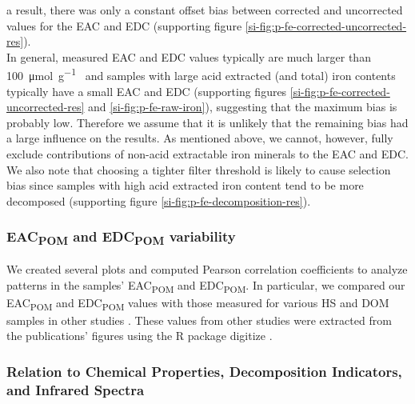 \documentclass[draft,linenumbers]{agujournal2018}
\begin{document}
a result, there was only a constant offset bias between corrected and
uncorrected values for the EAC and EDC (supporting figure
\ref{si-fig:p-fe-corrected-uncorrected-res}).\\
In general, measured EAC and EDC values typically are much larger than
\SI{100}{\micro\mol\per\gram\carbon} and samples with large acid
extracted (and total) iron contents typically have a small EAC and EDC
(supporting figures \ref{si-fig:p-fe-corrected-uncorrected-res} and
\ref{si-fig:p-fe-raw-iron}), suggesting that the maximum bias is
probably low. Therefore we assume that it is unlikely that the remaining
bias had a large influence on the results. As mentioned above, we
cannot, however, fully exclude contributions of non-acid extractable
iron minerals to the EAC and EDC. We also note that choosing a tighter
filter threshold is likely to cause selection bias since samples with
high acid extracted iron content tend to be more decomposed (supporting
figure \ref{si-fig:p-fe-decomposition-res}).

\subsubsection{\texorpdfstring{EAC\textsubscript{POM} and
EDC\textsubscript{POM} variability}{EAC and EDC variability}}

We created several plots and computed Pearson correlation coefficients
to analyze patterns in the samples' EAC\textsubscript{POM} and
EDC\textsubscript{POM}. In particular, we compared our
EAC\textsubscript{POM} and EDC\textsubscript{POM} values with those
measured for various HS and DOM samples in other studies
\citep{Aeschbacher.2012, Tan.2017, Walpen.2018}. These values from other
studies were extracted from the publications' figures using the R
package digitize \citep{Poisot.2011}.

\subsubsection{Relation to Chemical Properties, Decomposition
Indicators, and Infrared Spectra}
\end{document}
